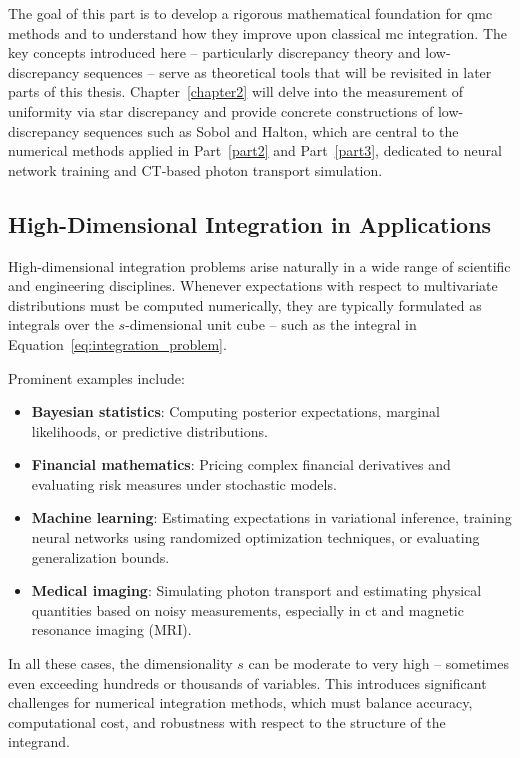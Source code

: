 The goal of this part is to develop a rigorous mathematical foundation for
\ac{qmc} methods and to understand how they improve upon classical \ac{mc}
integration. The key concepts introduced here -- particularly discrepancy theory
and low-discrepancy sequences -- serve as theoretical tools that will be
revisited in later parts of this thesis.
Chapter~\ref{chapter2} will delve into the
measurement of uniformity via star discrepancy and provide concrete
constructions of low-discrepancy sequences such as Sobol and Halton, which are
central to the numerical methods applied in Part~\ref{part2} and
Part~\ref{part3}, dedicated to neural network training and CT-based photon
transport simulation.


\subsection{High-Dimensional Integration in Applications}
High-dimensional integration problems arise naturally in a wide range of
scientific and engineering disciplines. Whenever expectations with respect to
multivariate distributions must be computed numerically, they are typically
formulated as integrals over the $s$-dimensional unit cube -- such as the
integral in Equation~\eqref{eq:integration_problem}.

Prominent examples include:
\begin{itemize}
    \item \textbf{Bayesian statistics}: Computing posterior expectations, marginal likelihoods, or predictive distributions.
    \item \textbf{Financial mathematics}: Pricing complex financial derivatives and evaluating risk measures under stochastic models.
    \item \textbf{Machine learning}: Estimating expectations in variational inference, training neural networks using randomized optimization techniques, or evaluating generalization bounds.
    \item \textbf{Medical imaging}: Simulating photon transport and estimating physical quantities based on noisy measurements, especially in \ac{ct} and magnetic resonance imaging (MRI).
\end{itemize}

In all these cases, the dimensionality $s$ can be moderate to very high --
sometimes even exceeding hundreds or thousands of variables. This introduces
significant challenges for numerical integration methods, which must balance
accuracy, computational cost, and robustness with respect to the structure of
the integrand.


